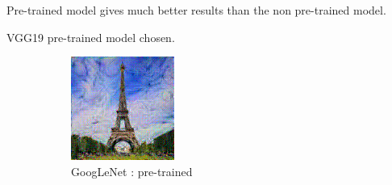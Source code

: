 \documentclass[12pt]{beamer}
\begin{document}
\begin{frame}
        Pre-trained model gives much better results than the non pre-trained model.
        
        \footnotesize{VGG19 pre-trained model chosen.}
    \end{frame}
    
    \begin{frame}
        \begin{figure}[H]
            \centering
            \begin{subfigure}[b]{0.45\textwidth}
                \centering
                \includegraphics[width=\textwidth]{resources/gatys/models/googlenet.png}
                \caption{GoogLeNet : pre-trained}
            \end{subfigure}
            \hfill
            \begin{subfigure}[b]{0.45\textwidth}
                \centering

\end{subfigure}
\end{figure}
\end{frame}
\end{document}
